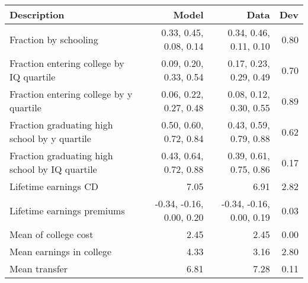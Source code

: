 \begin{tabular}{lrrr}
\hline
Description & Model  & Data  & Dev  \\ 
\hline
Fraction by schooling & 0.33, 0.45, 0.08, 0.14  & 0.34, 0.46, 0.11, 0.10  & 0.80  \\ 
Fraction entering college by IQ quartile & 0.09, 0.20, 0.33, 0.54  & 0.17, 0.23, 0.29, 0.49  & 0.70  \\ 
Fraction entering college by y quartile & 0.06, 0.22, 0.27, 0.48  & 0.08, 0.12, 0.30, 0.55  & 0.89  \\ 
Fraction graduating high school by y quartile & 0.50, 0.60, 0.72, 0.84  & 0.43, 0.59, 0.79, 0.88  & 0.62  \\ 
Fraction graduating high school by IQ quartile & 0.43, 0.64, 0.72, 0.88  & 0.39, 0.61, 0.75, 0.86  & 0.17  \\ 
Lifetime earnings CD & 7.05  & 6.91  & 2.82  \\ 
Lifetime earnings premiums & -0.34, -0.16, 0.00, 0.20  & -0.34, -0.16, 0.00, 0.19  & 0.03  \\ 
Mean of college cost & 2.45  & 2.45  & 0.00  \\ 
Mean earnings in college & 4.33  & 3.16  & 2.80  \\ 
Mean transfer & 6.81  & 7.28  & 0.11  \\ 
\hline
\end{tabular}%
